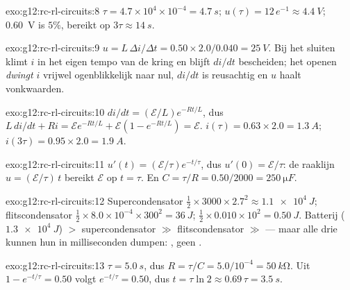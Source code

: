 \begin{solution}{exo:g12:rc-rl-circuits:8}
$\tau = 4.7\times10^{4} \times 10^{-4} = \qty{4.7}{s}$;
$u(\tau) = 12\,e^{-1} \approx \qty{4.4}{V}$; \qty{0.60}{V} is $5\%$, bereikt
op $3\tau \approx \qty{14}{s}$.
\end{solution}

\begin{solution}{exo:g12:rc-rl-circuits:9}
$u = L\,\Delta i/\Delta t = 0.50 \times 2.0/0.040 = \qty{25}{V}$. Bij het
sluiten klimt $i$ in het eigen tempo van de kring en blijft $di/dt$ bescheiden;
het openen \emph{dwingt} $i$ vrijwel ogenblikkelijk naar nul, $di/dt$ is
reusachtig en $u$ haalt vonkwaarden.
\end{solution}

\begin{solution}{exo:g12:rc-rl-circuits:10}
$di/dt = (\mathcal{E}/L)e^{-Rt/L}$, dus $L\,di/dt + Ri =
\mathcal{E}e^{-Rt/L} + \mathcal{E}(1 - e^{-Rt/L}) = \mathcal{E}$.
$i(\tau) = 0.63 \times 2.0 = \qty{1.3}{A}$;
$i(3\tau) = 0.95 \times 2.0 = \qty{1.9}{A}$.
\end{solution}

\begin{solution}{exo:g12:rc-rl-circuits:11}
$u'(t) = (\mathcal{E}/\tau)e^{-t/\tau}$, dus $u'(0) = \mathcal{E}/\tau$: de
raaklijn $u = (\mathcal{E}/\tau)\,t$ bereikt $\mathcal{E}$ op $t = \tau$. En
$C = \tau/R = 0.50/2000 = \qty{250}{\micro F}$.
\end{solution}

\begin{solution}{exo:g12:rc-rl-circuits:12}
Supercondensator $\tfrac12 \times 3000 \times 2.7^2 \approx \qty{1.1e4}{J}$;
flitscondensator $\tfrac12 \times 8.0\times10^{-4} \times 300^2 =
\qty{36}{J}$;  $\tfrac12 \times 0.010 \times 10^2 = \qty{0.50}{J}$.
Batterij ($\qty{1.3e4}{J}$) $>$ supercondensator $\gg$ flitscondensator
$\gg$  --- maar alle drie kunnen hun  in milliseconden dumpen:
, geen .
\end{solution}

\begin{solution}{exo:g12:rc-rl-circuits:13}
$\tau = \qty{5.0}{s}$, dus $R = \tau/C = 5.0/10^{-4} = \qty{50}{k\ohm}$. Uit
$1 - e^{-t/\tau} = 0.50$ volgt $e^{-t/\tau} = 0.50$, dus $t = \tau\ln 2
\approx 0.69\,\tau = \qty{3.5}{s}$.
\end{solution}

